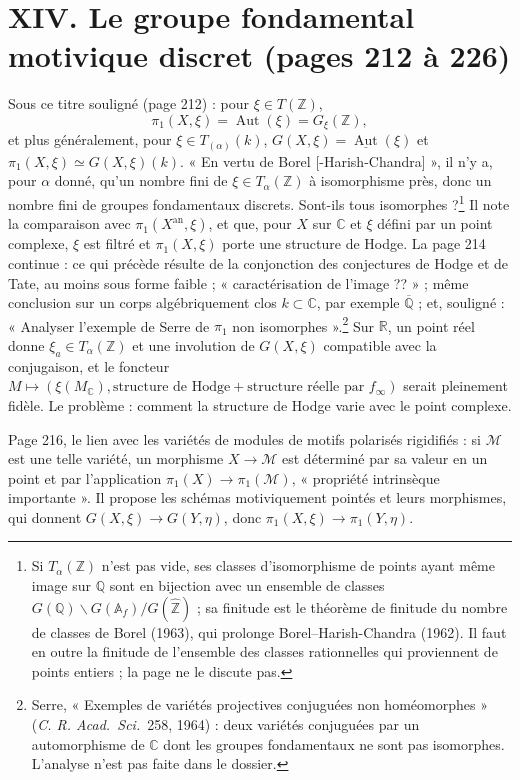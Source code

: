 \documentclass[11pt,a4paper]{article}
\begin{document}
\section*{XIV. Le groupe fondamental motivique discret (pages 212 à 226)}

Sous ce titre souligné (page 212) : pour $\xi \in T(\mathbb{Z})$,
\[
  \pi_{1}(X, \xi) = \operatorname{Aut}(\xi) = G_{\xi}(\mathbb{Z}) ,
\]
et plus généralement, pour $\xi \in T_{(\alpha)}(k)$, $G(X, \xi) =
\underline{\operatorname{Aut}}(\xi)$ et $\pi_{1}(X, \xi) \simeq G(X, \xi)(k)$.
« En vertu de Borel [-Harish-Chandra] », il n'y a, pour $\alpha$ donné, qu'un
nombre fini de $\xi \in T_{\alpha}(\mathbb{Z})$ à isomorphisme près, donc un
nombre fini de groupes fondamentaux discrets. Sont-ils tous isomorphes
?\footnote{Si $T_{\alpha}(\mathbb{Z})$ n'est pas vide, ses classes
d'isomorphisme de points ayant même image sur $\mathbb{Q}$ sont en bijection avec
un ensemble de classes $G(\mathbb{Q}) \backslash G(\mathbb{A}_{f}) /
G(\widehat{\mathbb{Z}})$ ; sa finitude est le théorème de finitude du nombre de
classes de Borel (1963), qui prolonge Borel--Harish-Chandra (1962). Il faut en
outre la finitude de l'ensemble des classes rationnelles qui proviennent de
points entiers ; la page ne le discute pas.} Il note la comparaison avec
$\pi_{1}(X^{\mathrm{an}}, \xi)$, et que, pour $X$ sur $\mathbb{C}$ et $\xi$
défini par un point complexe, $\xi$ est filtré et $\pi_{1}(X, \xi)$ porte une
structure de Hodge. La page 214 continue : ce qui précède résulte de la
conjonction des conjectures de Hodge et de Tate, au moins sous forme faible ;
« caractérisation de l'image ?? » ; même conclusion sur un corps algébriquement
clos $k \subset \mathbb{C}$, par exemple $\overline{\mathbb{Q}}$ ; et, souligné :
« Analyser l'exemple de Serre de $\pi_{1}$ non isomorphes ».\footnote{Serre,
« Exemples de variétés projectives conjuguées non homéomorphes » (\emph{C. R.
Acad.\ Sci.}\ 258, 1964) : deux variétés conjuguées par un automorphisme de
$\mathbb{C}$ dont les groupes fondamentaux ne sont pas isomorphes. L'analyse
n'est pas faite dans le dossier.} Sur $\mathbb{R}$, un point réel donne $\xi_{a}
\in T_{\alpha}(\mathbb{Z})$ et une involution de $G(X, \xi)$ compatible avec la
conjugaison, et le foncteur $M \mapsto (\xi(M_{\mathbb{C}}), \text{structure de
Hodge} + \text{structure réelle par } f_{\infty})$ serait pleinement fidèle. Le
problème : comment la structure de Hodge varie avec le point complexe.

Page 216, le lien avec les variétés de modules de motifs polarisés rigidifiés :
si $\mathcal{M}$ est une telle variété, un morphisme $X \to \mathcal{M}$ est
déterminé par sa valeur en un point et par l'application $\pi_{1}(X) \to
\pi_{1}(\mathcal{M})$, « propriété intrinsèque importante ». Il propose les
schémas motiviquement pointés et leurs morphismes, qui donnent $G(X, \xi) \to
G(Y, \eta)$, donc $\pi_{1}(X, \xi) \to \pi_{1}(Y, \eta)$.
\end{document}
